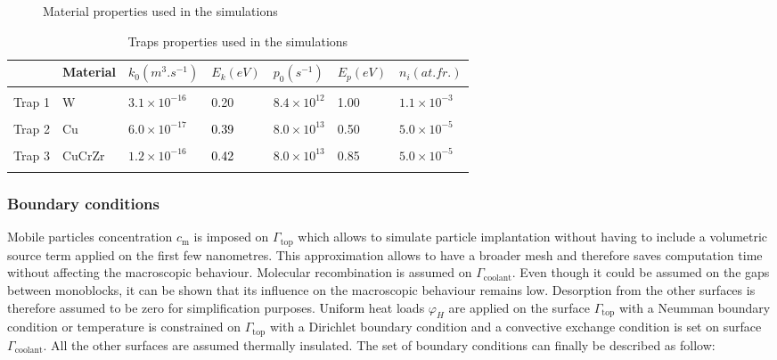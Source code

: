 \begin{figure} [h!]
\begin{subfigure}{0.5\linewidth}
    \end{subfigure}
    \caption{Material properties used in the simulations \cite{reiter_compilation_1996, serra_hydrogen_1998, fernandez_hydrogen_2015}}
    \label{fig:properties_2}
\end{figure}

\begin{table} [ht]
    \centering
    \begin{tabular}{L{1.5cm} L{1.5cm} R{1.6cm} R{1.1cm} R{1.6cm} R{1.1cm} R{2cm}}
         & Material & $k_0 (\si{m^3.s^{-1}})$ &  $E_k (\si{eV})$ & $p_0 (\si{s^{-1}})$ & $E_p (\si{eV})$ & $n_i (\si{at.fr.})$ \\
        \hline
        \\
       Trap 1 & W & $3.1 \times 10^{-16}$ & 0.20 & $8.4 \times 10^{12}$& 1.00 & $1.1 \times 10^{-3}$ \\
        \\
        Trap 2 & Cu & $6.0 \times 10^{-17}$ & \textcolor{black}{0.39} & $8.0 \times 10^{13}$ & 0.50 &$5.0 \times 10^{-5}$\\
        \\
        Trap 3 & CuCrZr & $1.2 \times 10^{-16}$ & \textcolor{black}{0.42} & $8.0 \times 10^{13}$ & 0.85 &$5.0 \times 10^{-5}$\\
        \\
    \end{tabular}
    \caption{Traps properties used in the simulations \cite{hodille_macroscopic_2015, dolan_assessment_1994}}
    \label{tab:traps monoblock}
\end{table}

\subsubsection{Boundary conditions}

Mobile particles concentration $c_\mathrm{m}$ is imposed on $\Gamma_\mathrm{top}$ which allows to simulate particle implantation without having to include a volumetric source term applied on the first few nanometres.
This approximation allows to have a broader mesh and therefore saves computation time without affecting the macroscopic behaviour.
Molecular recombination is assumed on $\Gamma_\mathrm{coolant}$.
Even though it could be assumed on the gaps between monoblocks, it can be shown that its influence on the macroscopic behaviour remains low.
Desorption from the other surfaces is therefore assumed to be zero for simplification purposes.
\textcolor{black}{Uniform} heat loads $\varphi_H$ are applied on the surface $\Gamma_\mathrm{top}$ with a Neumman boundary condition or temperature is constrained on $\Gamma_\mathrm{top}$ with a Dirichlet boundary condition and a convective exchange condition is set on surface $\Gamma_\mathrm{coolant}$.
All the other surfaces are assumed thermally insulated.
The set of boundary conditions can finally be described as follow:

